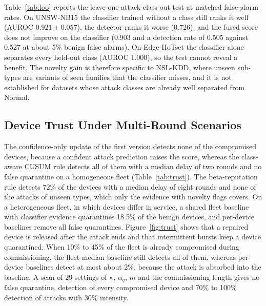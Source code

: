 \documentclass[journal]{IEEEtran}
\begin{document}
\begin{table}[t]
\centering
\caption{NSL-KDD: LightGBM with Normal-profile fusion.}
\label{tab:novelty}
\scriptsize
\setlength{\tabcolsep}{2.5pt}
\resizebox{\columnwidth}{!}{}
\end{table}

Table~\ref{tab:loo} reports the leave-one-attack-class-out test at matched false-alarm rates. On UNSW-NB15 the classifier trained without a class still ranks it well (AUROC $0.921\pm0.057$), the detector ranks it worse (0.726), and the fused score does not improve on the classifier (0.903 and a detection rate of 0.505 against 0.527 at about 5\% benign false alarms). On Edge-IIoTset the classifier alone separates every held-out class (AUROC 1.000), so the test cannot reveal a benefit. The novelty gain is therefore specific to NSL-KDD, where unseen sub-types are variants of seen families that the classifier misses, and it is not established for datasets whose attack classes are already well separated from Normal.

\begin{table}[t]
\centering
\caption{Leave-one-attack-class-out at matched benign false-alarm rate (5\%).}
\label{tab:loo}
\scriptsize
\setlength{\tabcolsep}{2.5pt}
\resizebox{\columnwidth}{!}{}
\end{table}

\subsection{Device Trust Under Multi-Round Scenarios}
The confidence-only update of the first version detects none of the compromised devices, because a confident attack prediction raises the score, whereas the class-aware CUSUM rule detects all of them with a median delay of two rounds and no false quarantine on a homogeneous fleet (Table~\ref{tab:trust}). The beta-reputation rule detects 72\% of the devices with a median delay of eight rounds and none of the attacks of unseen types, which only the evidence with novelty flags covers. On a heterogeneous fleet, in which devices differ in service, a shared fleet baseline with classifier evidence quarantines 18.5\% of the benign devices, and per-device baselines remove all false quarantines. Figure~\ref{fig:trust} shows that a repaired device is released after the attack ends and that intermittent bursts keep a device quarantined. When 10\% to 45\% of the fleet is already compromised during commissioning, the fleet-median baseline still detects all of them, whereas per-device baselines detect at most about 2\%, because the attack is absorbed into the baseline. A scan of 29 settings of $\kappa$, $\alpha_q$, $m$ and the commissioning length gives no false quarantine, detection of every compromised device and 70\% to 100\% detection of attacks with 30\% intensity.
\end{document}
